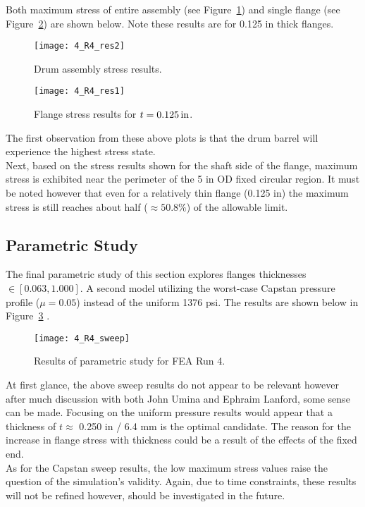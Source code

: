 Both maximum stress of entire assembly (see Figure~\ref{fig:4_R4_res2}) and single flange (see Figure~\ref{fig:4_R4_res1}) are shown below. Note these results are for 0.125 in thick flanges.

\begin{figure}[H]
	\centering
	\texttt{[image: 4\_R4\_res2]}
	\caption{Drum assembly stress results.}
	\label{fig:4_R4_res2}
\end{figure}
\begin{figure}[H]
	\centering
	\texttt{[image: 4\_R4\_res1]}
	\caption{Flange stress results for $t=0.125 \,\mathrm{in}$.}
	\label{fig:4_R4_res1}
\end{figure}

The first observation from these above plots is that the drum barrel will experience the highest stress state.\\

Next, based on the stress results shown for the shaft side of the flange, maximum stress is exhibited near the perimeter of the 5 in OD fixed circular region. It must be noted however that even for a relatively thin flange (0.125 in) the maximum stress is still reaches about half ($\approx 50.8\%$) of the allowable limit.

\subsection{Parametric Study}

The final parametric study of this section explores flanges thicknesses $\in [0.063, 1.000]$. A second model utilizing the worst-case Capstan pressure profile ($\mu=0.05$) instead of the uniform 1376 psi. The results are shown below in Figure~\ref{fig:4_R4_sweep} \cite{EXCEL}.

\begin{figure}[H]
	\centering
	\texttt{[image: 4\_R4\_sweep]}
	\caption{Results of parametric study for FEA Run 4.}
	\label{fig:4_R4_sweep}
\end{figure}

At first glance, the above sweep results do not appear to be relevant however after much discussion with both John Umina and Ephraim Lanford, some sense can be made. Focusing on the uniform pressure results would appear that a thickness of $t\approx$ 0.250 in / 6.4 mm  is the optimal candidate. The reason for the increase in flange stress with thickness could be a result of the effects of the fixed end.\\

As for the Capstan sweep results, the low maximum stress values raise the question of the simulation's validity. Again, due to time constraints, these results will not be refined however, should be investigated in the future.

